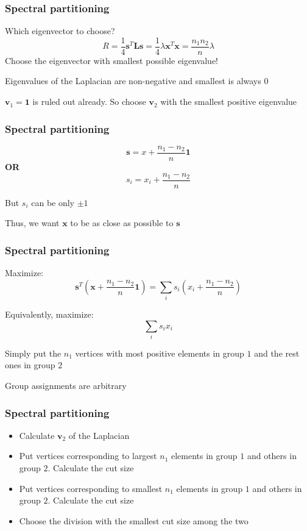 \documentclass{beamer}
\begin{document}
\begin{frame}
    \frametitle{Spectral partitioning}
    \centering
    Which eigenvector to choose?
    $$R = \frac{1}{4}{\mathbf s}^T{\mathbf L}{\mathbf s} = \frac{1}{4}\lambda{\mathbf x}^T{\mathbf x} = \frac{n_1n_2}{n}\lambda$$
    Choose the eigenvector with smallest possible eigenvalue!

    \vspace{1em}
    Eigenvalues of the Laplacian are non-negative and smallest is always $0$

    \vspace{1em}
    ${\mathbf v}_1 = {\mathbf 1}$ is ruled out already. So choose ${\mathbf v}_2$ with the smallest positive eigenvalue
\end{frame}
\begin{frame}
    \frametitle{Spectral partitioning}
    \centering
    $${\mathbf s} = x + \frac{n_1-n_2}{n}{\mathbf 1}$$
    {\bf OR}
    $$s_i = x_i + \frac{n_1-n_2}{n}$$

    \vspace{2em}
    But $s_i$ can be only $\pm 1$

    \vspace{2em}
    Thus, we want ${\mathbf x}$ to be as close as possible to ${\mathbf s}$
\end{frame}
\begin{frame}
    \frametitle{Spectral partitioning}
    Maximize:
    \centering
    $${\mathbf s}^T\left({\mathbf x + \frac{n_1-n_2}{n}{\mathbf 1}}\right) = \sum\limits_is_i\left(x_i + \frac{n_1-n_2}{n}\right)$$

    Equivalently, maximize:
    $$\sum\limits_is_ix_i$$

    Simply put the $n_1$ vertices with most positive elements in group $1$ and the rest ones in group $2$

    \vspace{1em}
    Group assignments are arbitrary
\end{frame}
\begin{frame}
    \frametitle{Spectral partitioning}
    \centering

    \begin{itemize}
        \setlength\itemsep{1em}
        \item{Calculate ${\mathbf v}_2$ of the Laplacian}
        \item{Put vertices corresponding to largest $n_1$ elements in group $1$ and others in group $2$. Calculate the cut size}
        \item{Put vertices corresponding to smallest $n_1$ elements in group $1$ and others in group $2$. Calculate the cut size}
        \item{Choose the division with the smallest cut size among the two}
    \end{itemize}
\end{frame}
\end{document}
